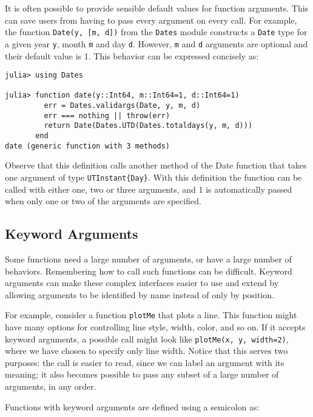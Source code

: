 \documentclass[
]{article}
\begin{document}
It is often possible to provide sensible default values for function
arguments. This can save users from having to pass every argument on
every call. For example, the function \texttt{Date(y,\ {[}m,\ d{]})}
from the \texttt{Dates} module constructs a \texttt{Date} type for a
given year \texttt{y}, month \texttt{m} and day \texttt{d}. However,
\texttt{m} and \texttt{d} arguments are optional and their default value
is 1. This behavior can be expressed concisely as:

\begin{verbatim}
julia> using Dates

julia> function date(y::Int64, m::Int64=1, d::Int64=1)
         err = Dates.validargs(Date, y, m, d)
         err === nothing || throw(err)
         return Date(Dates.UTD(Dates.totaldays(y, m, d)))
       end
date (generic function with 3 methods)
\end{verbatim}

Observe that this definition calls another method of the Date function
that takes one argument of type \texttt{UTInstant\{Day\}}. With this
definition the function can be called with either one, two or three
arguments, and 1 is automatically passed when only one or two of the
arguments are specified.

\hypertarget{keyword-arguments}{%
\subsection{Keyword Arguments}\label{keyword-arguments}}

Some functions need a large number of arguments, or have a large number
of behaviors. Remembering how to call such functions can be difficult.
Keyword arguments can make these complex interfaces easier to use and
extend by allowing arguments to be identified by name instead of only by
position.

For example, consider a function \texttt{plotMe} that plots a line. This
function might have many options for controlling line style, width,
color, and so on. If it accepts keyword arguments, a possible call might
look like \texttt{plotMe(x,\ y,\ width=2)}, where we have chosen to
specify only line width. Notice that this serves two purposes: the call
is easier to read, since we can label an argument with its meaning; it
also becomes possible to pass any subset of a large number of arguments,
in any order.

Functions with keyword arguments are defined using a semicolon
as:
\end{document}
